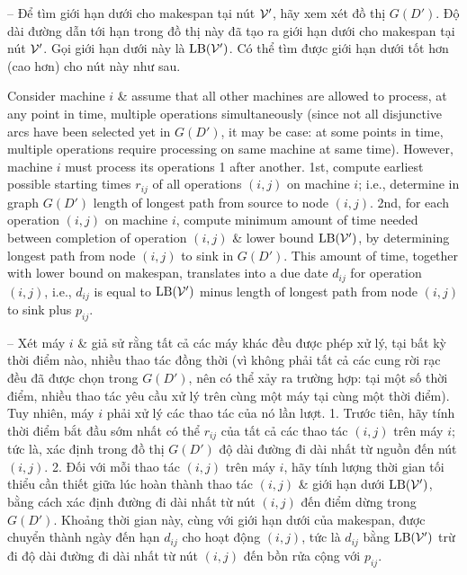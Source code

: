 \documentclass{article}
\begin{document}
\begin{itemize}
\begin{itemize}
        -- Để tìm giới hạn dưới cho makespan tại nút ${\cal V}'$, hãy xem xét đồ thị $G(D')$. Độ dài đường dẫn tới hạn trong đồ thị này đã tạo ra giới hạn dưới cho makespan tại nút ${\cal V}'$. Gọi giới hạn dưới này là ${\rm LB}({\cal V}')$. Có thể tìm được giới hạn dưới tốt hơn (cao hơn) cho nút này như sau.

        Consider machine $i$ \& assume that all other machines are allowed to process, at any point in time, multiple operations simultaneously (since not all disjunctive arcs have been selected yet in $G(D')$, it may be case: at some points in time, multiple operations require processing on same machine at same time). However, machine $i$ must process its operations 1 after another. 1st, compute earliest possible starting times $r_{ij}$ of all operations $(i,j)$ on machine $i$; i.e., determine in graph $G(D')$ length of longest path from source to node $(i,j)$. 2nd, for each operation $(i,j)$ on machine $i$, compute minimum amount of time needed between completion of operation $(i,j)$ \& lower bound ${\rm LB}({\cal V}')$, by determining longest path from node $(i,j)$ to sink in $G(D')$. This amount of time, together with lower bound on makespan, translates into a due date $d_{ij}$ for operation $(i,j)$, i.e., $d_{ij}$ is equal to ${\rm LB}({\cal V}')$ minus length of longest path from node $(i,j)$ to sink plus $p_{ij}$.

        -- Xét máy $i$ \& giả sử rằng tất cả các máy khác đều được phép xử lý, tại bất kỳ thời điểm nào, nhiều thao tác đồng thời (vì không phải tất cả các cung rời rạc đều đã được chọn trong $G(D')$, nên có thể xảy ra trường hợp: tại một số thời điểm, nhiều thao tác yêu cầu xử lý trên cùng một máy tại cùng một thời điểm). Tuy nhiên, máy $i$ phải xử lý các thao tác của nó lần lượt. 1. Trước tiên, hãy tính thời điểm bắt đầu sớm nhất có thể $r_{ij}$ của tất cả các thao tác $(i,j)$ trên máy $i$; tức là, xác định trong đồ thị $G(D')$ độ dài đường đi dài nhất từ nguồn đến nút $(i,j)$. 2. Đối với mỗi thao tác $(i,j)$ trên máy $i$, hãy tính lượng thời gian tối thiểu cần thiết giữa lúc hoàn thành thao tác $(i,j)$ \& giới hạn dưới ${\rm LB}({\cal V}')$, bằng cách xác định đường đi dài nhất từ nút $(i,j)$ đến điểm dừng trong $G(D')$. Khoảng thời gian này, cùng với giới hạn dưới của makespan, được chuyển thành ngày đến hạn $d_{ij}$ cho hoạt động $(i,j)$, tức là $d_{ij}$ bằng ${\rm LB}({\cal V}')$ trừ đi độ dài đường đi dài nhất từ nút $(i,j)$ đến bồn rửa cộng với $p_{ij}$.


\end{itemize}
\end{itemize}
\end{document}
